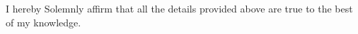I hereby Solemnly affirm that all the details provided above are true to the best of my knowledge. 
\begin{flushright}
\end{flushright}

